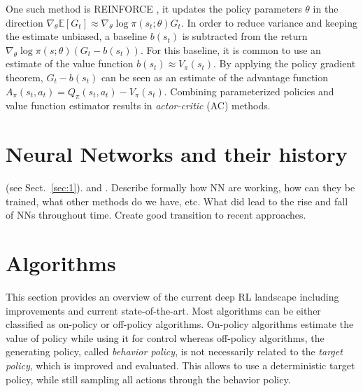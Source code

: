     One such method is REINFORCE \cite{Williams1992}, it updates the policy parameters $\theta$ in the direction $\nabla_\theta \mathbb{E}[G_t]\approx \nabla_\theta\log\pi(s_t;\theta)G_t$.
    In order to reduce variance and keeping the estimate unbiased, a baseline $b(s_t)$ is subtracted from the return $\nabla_\theta\log\pi(s;\theta)(G_t - b(s_t))$. 
    For this baseline, it is common to use an estimate of the value function $b(s_t)\approx V_\pi(s_t)$.
    By applying the policy gradient theorem, $G_t-b(s_t)$ can be seen as an estimate of the advantage function $A_\pi(s_t,a_t) = Q_\pi(s_t,a_t) - V_\pi(s_t)$.
    Combining parameterized policies and value function estimator results in \textit{actor-critic} (AC) methods. 
    
    \section{Neural Networks and their history}
    \label{sec:def}
    (see Sect.~\ref{sec:1}).
    \cite{RefB} and \cite{RefJ}.
    Describe formally how NN are working, how can they be trained, what other methods do we have, etc.
    What did lead to the rise and fall of NNs throughout time.
    Create good transition to recent approaches.

    \section{Algorithms}
	    \label{sec:algo}
	    This section provides an overview of the current deep RL landscape including improvements and current state-of-the-art. 
	    Most algorithms can be either classified as on-policy or off-policy algorithms.
		On-policy algorithms estimate the value of policy while using it for control whereas off-policy algorithms, the generating policy, called \textit{behavior policy}, is not necessarily related to the \textit{target policy}, which is improved and evaluated.
		This allows to use a deterministic target policy, while still sampling all actions through the behavior policy. \cite[chapter 5]{Sutton2018}
		
